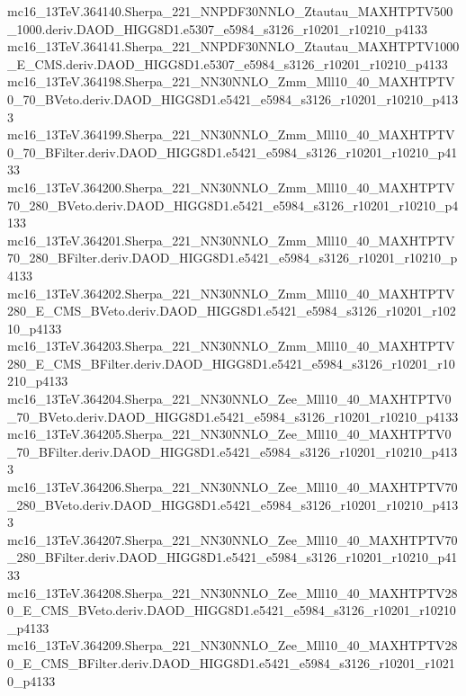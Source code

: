 \begin{scriptsize}
mc16\_13TeV.364140.Sherpa\_221\_NNPDF30NNLO\_Ztautau\_MAXHTPTV500\_1000.deriv.DAOD\_HIGG8D1.e5307\_e5984\_s3126\_r10201\_r10210\_p4133 \\
mc16\_13TeV.364141.Sherpa\_221\_NNPDF30NNLO\_Ztautau\_MAXHTPTV1000\_E\_CMS.deriv.DAOD\_HIGG8D1.e5307\_e5984\_s3126\_r10201\_r10210\_p4133 \\
mc16\_13TeV.364198.Sherpa\_221\_NN30NNLO\_Zmm\_Mll10\_40\_MAXHTPTV0\_70\_BVeto.deriv.DAOD\_HIGG8D1.e5421\_e5984\_s3126\_r10201\_r10210\_p4133 \\
mc16\_13TeV.364199.Sherpa\_221\_NN30NNLO\_Zmm\_Mll10\_40\_MAXHTPTV0\_70\_BFilter.deriv.DAOD\_HIGG8D1.e5421\_e5984\_s3126\_r10201\_r10210\_p4133 \\
mc16\_13TeV.364200.Sherpa\_221\_NN30NNLO\_Zmm\_Mll10\_40\_MAXHTPTV70\_280\_BVeto.deriv.DAOD\_HIGG8D1.e5421\_e5984\_s3126\_r10201\_r10210\_p4133 \\
mc16\_13TeV.364201.Sherpa\_221\_NN30NNLO\_Zmm\_Mll10\_40\_MAXHTPTV70\_280\_BFilter.deriv.DAOD\_HIGG8D1.e5421\_e5984\_s3126\_r10201\_r10210\_p4133 \\
mc16\_13TeV.364202.Sherpa\_221\_NN30NNLO\_Zmm\_Mll10\_40\_MAXHTPTV280\_E\_CMS\_BVeto.deriv.DAOD\_HIGG8D1.e5421\_e5984\_s3126\_r10201\_r10210\_p4133 \\
mc16\_13TeV.364203.Sherpa\_221\_NN30NNLO\_Zmm\_Mll10\_40\_MAXHTPTV280\_E\_CMS\_BFilter.deriv.DAOD\_HIGG8D1.e5421\_e5984\_s3126\_r10201\_r10210\_p4133 \\
mc16\_13TeV.364204.Sherpa\_221\_NN30NNLO\_Zee\_Mll10\_40\_MAXHTPTV0\_70\_BVeto.deriv.DAOD\_HIGG8D1.e5421\_e5984\_s3126\_r10201\_r10210\_p4133 \\
mc16\_13TeV.364205.Sherpa\_221\_NN30NNLO\_Zee\_Mll10\_40\_MAXHTPTV0\_70\_BFilter.deriv.DAOD\_HIGG8D1.e5421\_e5984\_s3126\_r10201\_r10210\_p4133 \\
mc16\_13TeV.364206.Sherpa\_221\_NN30NNLO\_Zee\_Mll10\_40\_MAXHTPTV70\_280\_BVeto.deriv.DAOD\_HIGG8D1.e5421\_e5984\_s3126\_r10201\_r10210\_p4133 \\
mc16\_13TeV.364207.Sherpa\_221\_NN30NNLO\_Zee\_Mll10\_40\_MAXHTPTV70\_280\_BFilter.deriv.DAOD\_HIGG8D1.e5421\_e5984\_s3126\_r10201\_r10210\_p4133 \\
mc16\_13TeV.364208.Sherpa\_221\_NN30NNLO\_Zee\_Mll10\_40\_MAXHTPTV280\_E\_CMS\_BVeto.deriv.DAOD\_HIGG8D1.e5421\_e5984\_s3126\_r10201\_r10210\_p4133 \\
mc16\_13TeV.364209.Sherpa\_221\_NN30NNLO\_Zee\_Mll10\_40\_MAXHTPTV280\_E\_CMS\_BFilter.deriv.DAOD\_HIGG8D1.e5421\_e5984\_s3126\_r10201\_r10210\_p4133 \\

\end{scriptsize}
